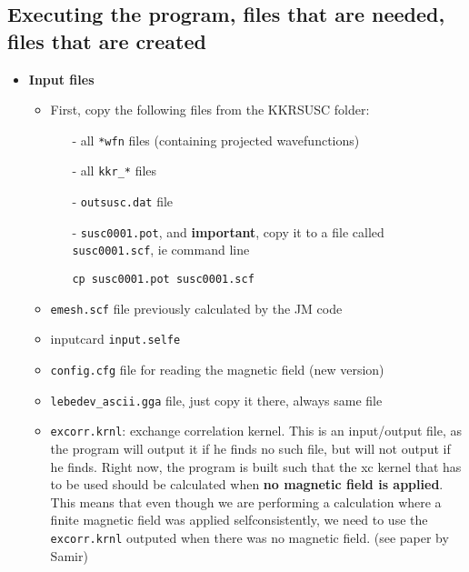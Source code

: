 \documentclass[a4paper,10pt,fullpage]{report}
\begin{document}
\subsection{Executing the program, files that are needed, files that are created}

\begin{itemize}


\item  \textbf{Input files} 
\begin{itemize}



\item First, copy the following files from the KKRSUSC folder:

\begin{itemize}

 \item[-] all \verb|*wfn| files (containing projected wavefunctions)
 
  \item[-] all \verb|kkr_*| files
  
  \item[-] \verb|outsusc.dat| file
 
  \item[-] \verb|susc0001.pot|, and \textbf{important}, 
  copy it to a file called \verb|susc0001.scf|,
  ie command line
  
  \verb|cp susc0001.pot susc0001.scf|
 
\end{itemize}

\item \verb|emesh.scf| file previously calculated by the JM code

\item inputcard \verb|input.selfe|

\item \verb|config.cfg| file for reading the magnetic field (new version)

\item \verb|lebedev_ascii.gga| file, just copy it there, always same file

\item  \verb|excorr.krnl|: exchange correlation kernel. This is an input/output file, as 
the program will output it if he finds no such file, but will not output if he finds.
Right now, the program is built such that the xc kernel that has to be used 
should be calculated when \textbf{no magnetic field is applied}.
This means that even though we are performing a calculation where
a finite magnetic field was applied selfconsistently, we need to use 
the \verb|excorr.krnl| outputed when there was no magnetic field. 
(see paper by Samir)


\end{itemize}
\end{itemize}
\end{document}
